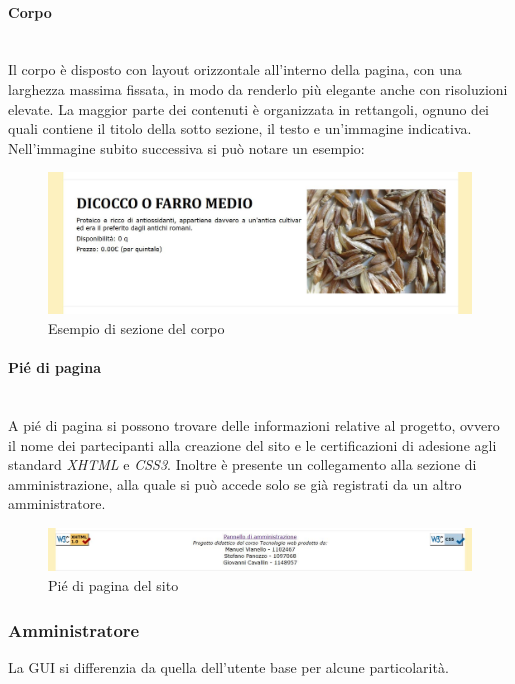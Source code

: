\paragraph{Corpo}
~\\Il corpo è disposto con layout orizzontale all'interno della pagina, con una larghezza massima fissata, in modo da renderlo più elegante anche con risoluzioni elevate. La maggior parte dei contenuti è organizzata in rettangoli, ognuno dei quali contiene il titolo della sotto sezione, il testo e un'immagine indicativa.
Nell'immagine subito successiva si può notare un esempio:
\begin{figure}[h!]
	\centerline{\includegraphics[scale=0.40]{img/corpo_esempio.jpg}}
	\caption{Esempio di sezione del corpo}
	\label{fig:corpoGU}
\end{figure}
\paragraph{Pié di pagina}
~\\A pié di pagina si possono trovare delle informazioni relative al progetto, ovvero il nome dei partecipanti alla creazione del sito e le certificazioni di adesione agli standard \emph{XHTML} e \emph{CSS3}. Inoltre è presente un collegamento alla sezione di amministrazione, alla quale si può accede solo se già registrati da un altro amministratore.
\begin{figure}[h!]
	\centerline{\includegraphics[scale=0.45]{img/footer.jpg}}
	\caption{Pié di pagina del sito}
	\label{fig:footer}
\end{figure}
\subsubsection{Amministratore}
La GUI si differenzia da quella dell'utente base per alcune particolarità.
